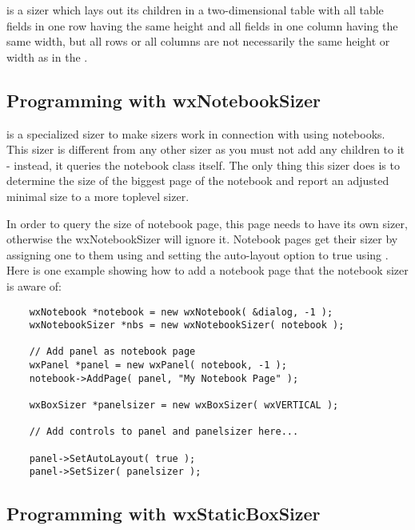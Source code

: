  is a sizer which lays out its children in a two-dimensional
table with all table fields in one row having the same
height and all fields in one column having the same width, but all
rows or all columns are not necessarily the same height or width as in
the .

\subsection{Programming with wxNotebookSizer}\label{notebooksizerprogramming}

 is a specialized sizer to make sizers work in connection
with using notebooks. This sizer is different from any other sizer as 
you must not add any children to it - instead, it queries the notebook class itself.
The only thing this sizer does is to determine the size of the biggest
page of the notebook and report an adjusted minimal size to a more toplevel
sizer.

In order to query the size of notebook page, this page needs to have its
own sizer, otherwise the wxNotebookSizer will ignore it. Notebook pages
get their sizer by assigning one to them using  
and setting the auto-layout option to true using 
. Here is one
example showing how to add a notebook page that the notebook sizer is
aware of:

\begin{verbatim}
    wxNotebook *notebook = new wxNotebook( &dialog, -1 );
    wxNotebookSizer *nbs = new wxNotebookSizer( notebook );

    // Add panel as notebook page
    wxPanel *panel = new wxPanel( notebook, -1 );
    notebook->AddPage( panel, "My Notebook Page" );

    wxBoxSizer *panelsizer = new wxBoxSizer( wxVERTICAL );

    // Add controls to panel and panelsizer here...

    panel->SetAutoLayout( true );
    panel->SetSizer( panelsizer );
\end{verbatim}

\subsection{Programming with wxStaticBoxSizer}\label{staticboxsizerprogramming}

